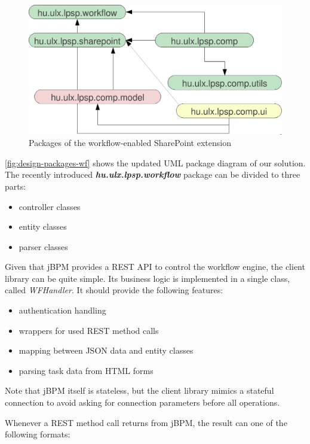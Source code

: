\begin{figure}[H]
\centering
\includegraphics[width=425px,keepaspectratio]{design-packages-wf.pdf}
\caption{Packages of the workflow-enabled SharePoint extension}
\label{fig:design-packages-wf}
\end{figure}

\autoref{fig:design-packages-wf} shows the updated UML package diagram of our
solution. The recently introduced \textbf{\emph{hu.ulx.lpsp.workflow}} package can be divided to three
parts:

\begin{itemize}
\item controller classes
\item entity classes
\item parser classes
\end{itemize}


Given that jBPM provides a REST API to control the workflow engine, the client
library can be quite simple. Its business logic is implemented in a single
class, called \emph{WFHandler}. It should provide the following features:

\begin{itemize}
\item authentication handling
\item wrappers for used REST method calls
\item mapping between JSON data and entity classes
\item parsing task data from HTML forms
\end{itemize}

Note that jBPM itself is stateless, but the client library mimics a stateful
connection to avoid asking for connection parameters before all operations.


Whenever a REST method call returns from jBPM, the result can one of the following formats:

